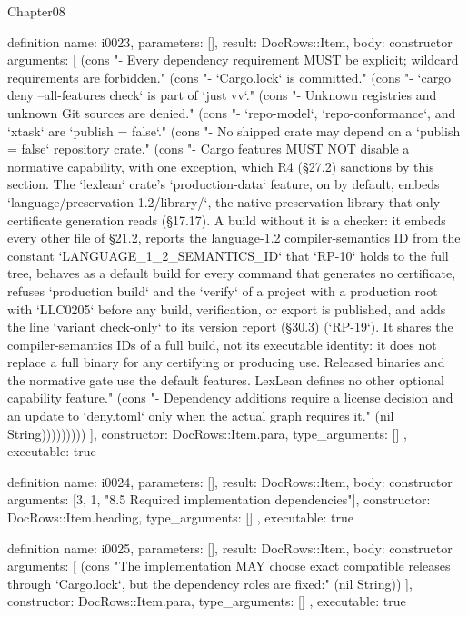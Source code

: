 \begin{lexlean}{Chapter08}
\begin{semanticmodule}
definition{
  name: i0023,
  parameters: [],
  result: DocRows::Item,
  body: constructor{
    arguments: [
      (cons "- Every dependency requirement MUST be explicit; wildcard requirements are forbidden." (cons "- `Cargo.lock` is committed." (cons "- `cargo deny --all-features check` is part of `just vv`." (cons "- Unknown registries and unknown Git sources are denied." (cons "- `repo-model`, `repo-conformance`, and `xtask` are `publish = false`." (cons "- No shipped crate may depend on a `publish = false` repository crate." (cons "- Cargo features MUST NOT disable a normative capability, with one exception, which R4 (§27.2) sanctions by this section. The `lexlean` crate's `production-data` feature, on by default, embeds `language/preservation-1.2/library/`, the native preservation library that only certificate generation reads (§17.17). A build without it is a checker: it embeds every other file of §21.2, reports the language-1.2 compiler-semantics ID from the constant `LANGUAGE_1_2_SEMANTICS_ID` that `RP-10` holds to the full tree, behaves as a default build for every command that generates no certificate, refuses `production build` and the `verify` of a project with a production root with `LLC0205` before any build, verification, or export is published, and adds the line `variant check-only` to its version report (§30.3) (`RP-19`). It shares the compiler-semantics IDs of a full build, not its executable identity: it does not replace a full binary for any certifying or producing use. Released binaries and the normative gate use the default features. LexLean defines no other optional capability feature." (cons "- Dependency additions require a license decision and an update to `deny.toml` only when the actual graph requires it." (nil String)))))))))
    ],
    constructor: DocRows::Item.para,
    type_arguments: []
  },
  executable: true
}

definition{
  name: i0024,
  parameters: [],
  result: DocRows::Item,
  body: constructor{
    arguments: [3, 1, "8.5 Required implementation dependencies"],
    constructor: DocRows::Item.heading,
    type_arguments: []
  },
  executable: true
}

definition{
  name: i0025,
  parameters: [],
  result: DocRows::Item,
  body: constructor{
    arguments: [
      (cons "The implementation MAY choose exact compatible releases through `Cargo.lock`, but the dependency roles are fixed:" (nil String))
    ],
    constructor: DocRows::Item.para,
    type_arguments: []
  },
  executable: true
}


\end{semanticmodule}
\end{lexlean}
